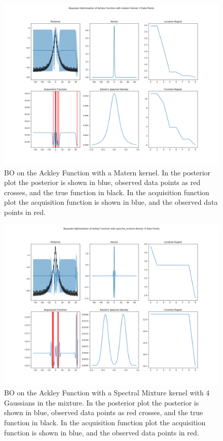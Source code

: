 \documentclass[a4paper]{article}
\begin{document}
\begin{figure}
\centering
\includegraphics[width=\textwidth]{ackley_matern_board09}
\caption{BO on the Ackley Function with a Matern kernel.
In the posterior plot the posterior is shown in blue, observed data points as red crosses, and the true function in black.
In the acquisition function plot the acquisition function is shown in blue, and the observed data points in red.}
\label{ackley_matern}
\end{figure}
\begin{figure}
\centering
\includegraphics[width=\textwidth]{ackley_sm_board09}
\caption{BO on the Ackley Function with a Spectral Mixture kernel with 4 Gaussians in the mixture.
In the posterior plot the posterior is shown in blue, observed data points as red crosses, and the true function in black.
In the acquisition function plot the acquisition function is shown in blue, and the observed data points in red.}
\label{ackley_sm}
\end{figure}
\end{document}
